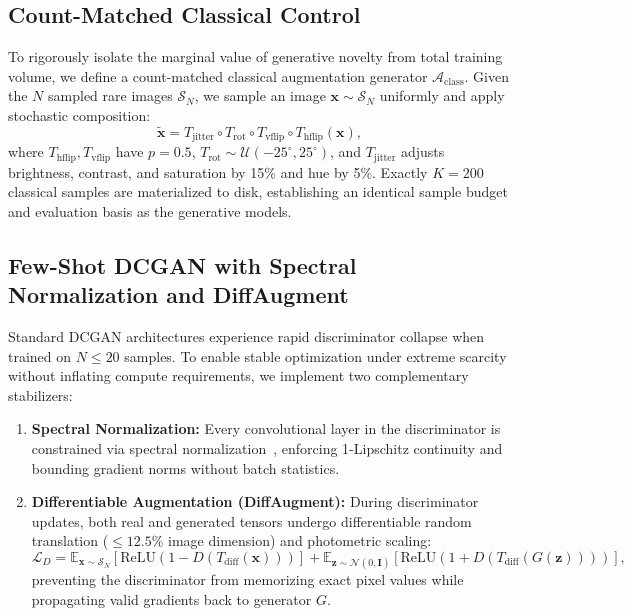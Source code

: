 \documentclass[runningheads]{llncs}
\begin{document}
\subsection{Count-Matched Classical Control}
To rigorously isolate the marginal value of generative novelty from total training volume, we define a count-matched classical augmentation generator $\mathcal{A}_{\text{class}}$. Given the $N$ sampled rare images $\mathcal{S}_N$, we sample an image $\mathbf{x} \sim \mathcal{S}_N$ uniformly and apply stochastic composition:
\begin{equation}
    \tilde{\mathbf{x}} = T_{\text{jitter}} \circ T_{\text{rot}} \circ T_{\text{vflip}} \circ T_{\text{hflip}}(\mathbf{x}),
\end{equation}
where $T_{\text{hflip}}, T_{\text{vflip}}$ have $p=0.5$, $T_{\text{rot}} \sim \mathcal{U}(-25^\circ, 25^\circ)$, and $T_{\text{jitter}}$ adjusts brightness, contrast, and saturation by 15\% and hue by 5\%. Exactly $K = 200$ classical samples are materialized to disk, establishing an identical sample budget and evaluation basis as the generative models.

\subsection{Few-Shot DCGAN with Spectral Normalization and DiffAugment}
Standard DCGAN architectures experience rapid discriminator collapse when trained on $N \le 20$ samples. To enable stable optimization under extreme scarcity without inflating compute requirements, we implement two complementary stabilizers:
\begin{enumerate}
    \item \textbf{Spectral Normalization:} Every convolutional layer in the discriminator is constrained via spectral normalization~\cite{zhao2020diffaugment}, enforcing 1-Lipschitz continuity and bounding gradient norms without batch statistics.
    \item \textbf{Differentiable Augmentation (DiffAugment):} During discriminator updates, both real and generated tensors undergo differentiable random translation ($\le 12.5\%$ image dimension) and photometric scaling:
    \begin{equation}
        \mathcal{L}_D = \mathbb{E}_{\mathbf{x} \sim \mathcal{S}_N} [\text{ReLU}(1 - D(T_{\text{diff}}(\mathbf{x})))] + \mathbb{E}_{\mathbf{z} \sim \mathcal{N}(0, \mathbf{I})} [\text{ReLU}(1 + D(T_{\text{diff}}(G(\mathbf{z}))))],
    \end{equation}
    preventing the discriminator from memorizing exact pixel values while propagating valid gradients back to generator $G$.
\end{enumerate}
\end{document}
